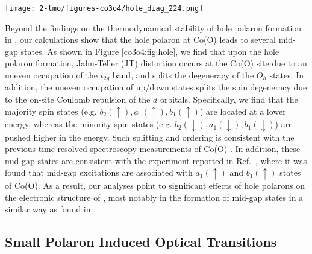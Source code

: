 \begin{figure*}%
\begin{center}
\texttt{[image: 2-tmo/figures-co3o4/hole\_diag\_224.png]}
\caption{\textbf{a.} Pristine band structure of \co\ with a 224 atom supercell (primitive cell band structure shown in SI Figure~S5). \textbf{b.} Hole polarons create a low-spin (LS) $d^5$ configuration at Co(O) along with a Jahn-Teller (JT) distortion which results in a $D_{4h}$ configuration and the creation of several mid-gap states. \textbf{c-e.} Wavefunction isosurface plots (yellow cloud) of the three polaron induced states under hole formation of $a_1(\uparrow)(d_{x^2-y^2})$, $b_1(\uparrow)(d_{z^2})$, and $b_2(\downarrow)(d_{xy})$ character, respectively. Isosurface plots use a cutoff value of 10\% the maximum. \textbf{f.} Band structure of \co\ with a hole polaron which shows several induced gap states (blue = spin up, black = spin down).}  \label{co3o4:fig:hole}
\end{center}
\end{figure*}

Beyond the findings on the thermodynamical stability of hole polaron formation in \co, our calculations show that the hole polaron at Co(O) leads to several mid-gap states. As shown in Figure \ref{co3o4:fig:hole}, we find that upon the hole polaron formation, Jahn-Teller (JT) distortion occurs at the Co(O) site due to an uneven occupation of the $t_{2g}$ band, and splits the degeneracy of the $O_h$ states. In addition, the uneven occupation of up/down states splits the spin degeneracy due to the on-site Coulomb repulsion of the $d$ orbitals. Specifically, we find that the majority spin states (e.g. $b_2(\uparrow), a_1(\uparrow), b_1(\uparrow)$) are located at a lower energy, whereas the minority spin states (e.g. $b_2(\downarrow), a_1(\downarrow), b_1(\downarrow)$) are pushed higher in the energy. Such splitting and ordering is consistent with the previous time-resolved spectroscopy measurements of Co(O) \cite{wu2016,belova1983}.
In addition, these mid-gap states are consistent with the experiment reported in Ref.~\cite{jiang2014}, where it was found that mid-gap excitations are associated with $a_1(\uparrow)$ and $b_1(\uparrow)$ states of Co(O). As a result, our analyses point to significant effects of hole polarons on the electronic structure of \co, most notably in the formation of mid-gap states in a similar way as found in .

\subsection{Small Polaron Induced Optical Transitions}

